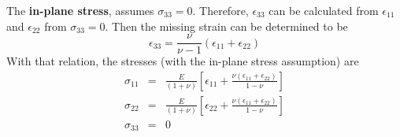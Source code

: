 \documentclass[12pt]{report}  %
\begin{document}
The {\bf in-plane stress}, assumes $\sigma_{33} = 0$.
Therefore, $\epsilon_{33}$ can be calculated from $\epsilon_{11}$ and $\epsilon_{22}$ from $\sigma_{33} = 0$. Then the missing strain can be determined to be
%
\begin{equation}
\epsilon_{33} = \frac{\nu}{\nu-1}(\epsilon_{11} + \epsilon_{22})
\end{equation}
%
With that relation, the stresses (with the in-plane stress assumption) are
%
\begin{eqnarray}
\sigma_{11} &=&
	\frac{E}{(1 + \nu)}\left[\epsilon_{11} + \frac{\nu (\epsilon_{11} + \epsilon_{22})}{1-\nu}\right] \\
\sigma_{22} &=&
	\frac{E}{(1 + \nu)}\left[\epsilon_{22} + \frac{\nu (\epsilon_{11} + \epsilon_{22})}{1-\nu}\right] \\
\sigma_{33} &=& 0
\end{eqnarray}
\end{document}
